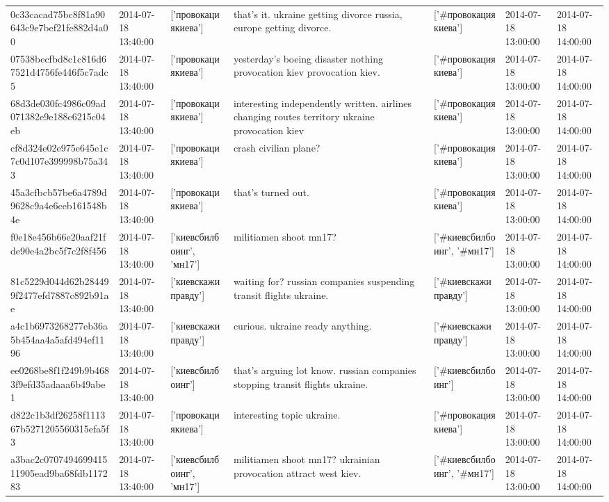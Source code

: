 \begin{tabular}{lllllll}
0c33cacad75bc8f81a90643c9e7bef21fe882d4a00 & 2014-07-18 13:40:00 & ['провокациякиева'] & that's it. ukraine getting divorce russia, europe getting divorce. & ['#провокациякиева'] & 2014-07-18 13:00:00 & 2014-07-18 14:00:00 \\
07538becfbd8c1c816d67521d4756fe446f5c7adc5 & 2014-07-18 13:40:00 & ['провокациякиева'] & yesterday's boeing disaster nothing provocation kiev provocation kiev. & ['#провокациякиева'] & 2014-07-18 13:00:00 & 2014-07-18 14:00:00 \\
68d3de030fc4986c09ad071382e9e188c6215c04eb & 2014-07-18 13:40:00 & ['провокациякиева'] & interesting independently written. airlines changing routes territory ukraine provocation kiev & ['#провокациякиева'] & 2014-07-18 13:00:00 & 2014-07-18 14:00:00 \\
cf8d324e02e975e645e1c7c0d107e399998b75a343 & 2014-07-18 13:40:00 & ['провокациякиева'] & crash civilian plane? & ['#провокациякиева'] & 2014-07-18 13:00:00 & 2014-07-18 14:00:00 \\
45a3cfbcb57be6a4789d9628c9a4e6ceb161548b4e & 2014-07-18 13:40:00 & ['провокациякиева'] & that's turned out. & ['#провокациякиева'] & 2014-07-18 13:00:00 & 2014-07-18 14:00:00 \\
f0e18e456b66e20aaf21fde90e4a2bc5f7c2f8f456 & 2014-07-18 13:40:00 & ['киевсбилбоинг', 'мн17'] & militiamen shoot mn17? & ['#киевсбилбоинг', '#мн17'] & 2014-07-18 13:00:00 & 2014-07-18 14:00:00 \\
81c5229d044d62b284499f2477efd7887c892b91ae & 2014-07-18 13:40:00 & ['киевскажиправду'] & waiting for? russian companies suspending transit flights ukraine. & ['#киевскажиправду'] & 2014-07-18 13:00:00 & 2014-07-18 14:00:00 \\
a4c1b6973268277eb36a5b454aa4a5afd494ef1196 & 2014-07-18 13:40:00 & ['киевскажиправду'] & curious. ukraine ready anything. & ['#киевскажиправду'] & 2014-07-18 13:00:00 & 2014-07-18 14:00:00 \\
ee0268be8f1f249b9b4683f9efd35adaaa6b49abe1 & 2014-07-18 13:40:00 & ['киевсбилбоинг'] & that's arguing lot know. russian companies stopping transit flights ukraine. & ['#киевсбилбоинг'] & 2014-07-18 13:00:00 & 2014-07-18 14:00:00 \\
d822c1b3df26258f111367b5271205560315efa5f3 & 2014-07-18 13:40:00 & ['провокациякиева'] & interesting topic ukraine. & ['#провокациякиева'] & 2014-07-18 13:00:00 & 2014-07-18 14:00:00 \\
a3bac2c070749469941511905ead9ba68fdb117283 & 2014-07-18 13:40:00 & ['киевсбилбоинг', 'мн17'] & militiamen shoot mn17? ukrainian provocation attract west kiev. & ['#киевсбилбоинг', '#мн17'] & 2014-07-18 13:00:00 & 2014-07-18 14:00:00 \\

\end{tabular}
